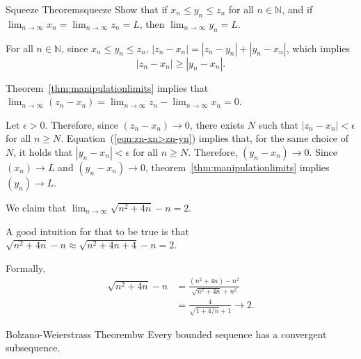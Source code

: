 
\begin{thm}{Squeeze Theorem}{squeeze}
Show that if $x_n \le y_n \le z_n$ for all $n \in \mathbb{N}$,
and if $\lim_{n\to\infty} x_n = \lim_{n\to\infty} z_n = L$, then $\lim_{n\to\infty} y_n = L$.  
\end{thm}

\begin{dem}{}{}
	For all \(n \in \mathbb{N}\), since \(x_n \leq y_n \leq z_n\), \( |z_n - x_n| = |z_n - y_n| + |y_n - x_n| \), which implies
	\begin{equation} \label{eqn:zn-xn>zn-yn}
		|z_n - x_n| \geq |y_n - x_n|.
	\end{equation}

	Theorem~\ref{thm:manipulationlimits} implies that \(\lim_{n\to\infty} (z_n - x_n) = \lim_{n\to\infty} z_n - \lim_{n\to\infty} x_n = 0\).

	Let \(\epsilon > 0\). Therefore, since \((z_n - x_n) \to 0\), there exists \(N\) such that \(|z_n - x_n| < \epsilon\) for all \(n \geq N\).
	Equation~(\ref{eqn:zn-xn>zn-yn}) implies that, for the same choice of \(N\), it holds that \(|y_n - x_n| < \epsilon\) for all \(n \geq N\). Therefore,  \((y_n - x_n) \to 0\).
	Since \((x_n) \to L\) and \((y_n - x_n) \to 0\), theorem~\ref{thm:manipulationlimits} implies \((y_n) \to L\).
\end{dem}

\begin{exmp}{}{}
	We claim that \(\lim_{n\to\infty} \sqrt{n^2 + 4n} - n = 2\).

	A good intuition for that to be true is that \(\sqrt{n^2 + 4n} - n \approx \sqrt{n^2 + 4n + 4} - n = 2\).

	Formally, \begin{align*}
		\sqrt{n^2 + 4n} - n &= \frac{(n^2 + 4n) - n^2}{\sqrt{n^2 + 4n} + n^2}\\
							&= \frac{4}{\sqrt{1 + 4/n} + 1} \to 2.
	\end{align*}
\end{exmp}

\begin{thm}{Bolzano-Weierstrass Theorem}{bw}
	Every bounded sequence has a convergent subsequence.
\end{thm}

